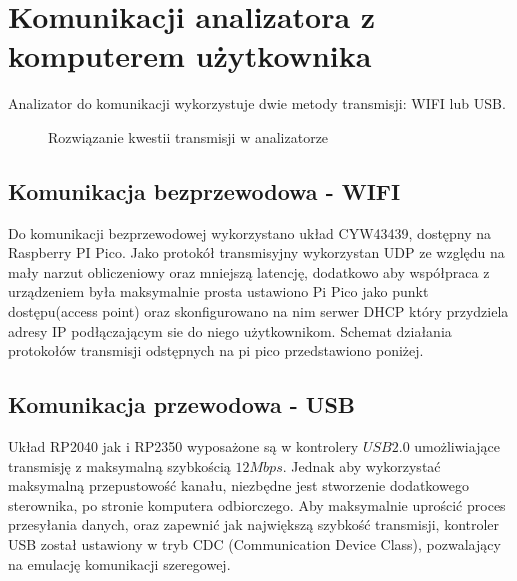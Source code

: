 \section{Komunikacji analizatora z komputerem użytkownika}
Analizator do komunikacji wykorzystuje dwie metody transmisji: WIFI lub USB.

\begin{figure}[ht]
    \centering
    \caption{Rozwiązanie kwestii transmisji w analizatorze}
    \label{fig:udp-komunikacja}
\end{figure}

\subsection{Komunikacja bezprzewodowa - WIFI}
    Do komunikacji bezprzewodowej wykorzystano układ CYW43439, dostępny na Raspberry PI Pico. 
    Jako protokół transmisyjny wykorzystan UDP ze względu na mały narzut
    obliczeniowy oraz mniejszą latencję, dodatkowo aby współpraca z urządzeniem była maksymalnie prosta ustawiono Pi Pico
    jako punkt dostępu(access point) oraz skonfigurowano na nim serwer DHCP który przydziela adresy
    IP podłączającym sie do niego użytkownikom. Schemat działania protokołów transmisji
    odstępnych na pi pico przedstawiono poniżej.


\subsection{Komunikacja przewodowa - USB}
    Układ RP2040 jak i RP2350 wyposażone są w kontrolery $USB 2.0$ umożliwiające transmisję z maksymalną szybkością $12Mbps$.
    Jednak aby wykorzystać maksymalną przepustowość kanału, niezbędne jest stworzenie dodatkowego sterownika, po stronie komputera odbiorczego.
    Aby maksymalnie uprościć proces przesyłania danych, oraz zapewnić jak największą szybkość transmisji, kontroler USB został ustawiony w tryb CDC (Communication Device Class),
    pozwalający na emulację komunikacji szeregowej.

